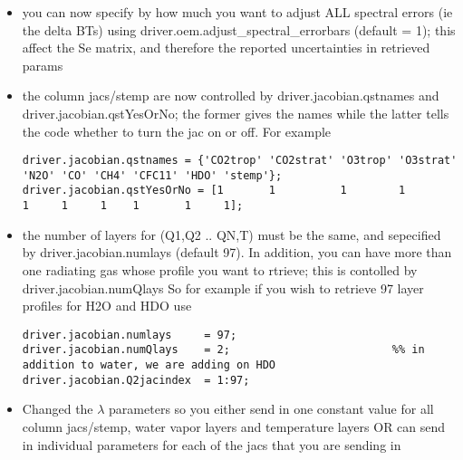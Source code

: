 \documentclass[11pt]{article}
\begin{document}
\begin{itemize}

\item you can now specify by how much you want to adjust ALL spectral errors (ie the delta BTs) using
 driver.oem.adjust\_spectral\_errorbars (default = 1); 
this affect the Se matrix, and therefore the reported uncertainties in retrieved params

\item the column jacs/stemp are now controlled by driver.jacobian.qstnames and driver.jacobian.qstYesOrNo; the former gives
      the names while the latter tells the code whether to turn the jac on or off. For example

\begin{verbatim}
driver.jacobian.qstnames = {'CO2trop' 'CO2strat' 'O3trop' 'O3strat' 'N2O' 'CO' 'CH4' 'CFC11' 'HDO' 'stemp'};
driver.jacobian.qstYesOrNo = [1       1          1        1         1     1     1    1       1     1];
\end{verbatim}

\item the number of layers for (Q1,Q2 .. QN,T) must be the same, and sepecified by driver.jacobian.numlays (default 97). In addition,
you can have more than one radiating gas whose profile you want to rtrieve; this is contolled by driver.jacobian.numQlays
So for example if you wish to retrieve 97 layer profiles for H2O and HDO use

\begin{verbatim}
driver.jacobian.numlays     = 97;
driver.jacobian.numQlays    = 2;                         %% in addition to water, we are adding on HDO
driver.jacobian.Q2jacindex  = 1:97;
\end{verbatim}

\item Changed the $\lambda$ parameters so you either send in one constant value for all column jacs/stemp, water vapor layers and
temperature layers OR can send in individual parameters for each of the jacs that you are sending in \\


\end{itemize}
\end{document}
